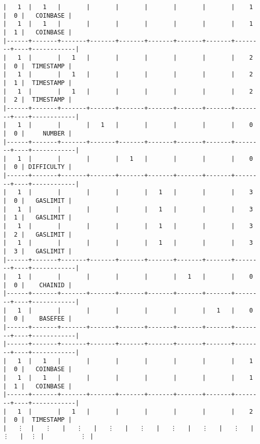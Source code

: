 \documentclass[varwidth=\maxdimen,margin=0.5cm,multi={verbatim}]{standalone}
\begin{document}
\begin{verbatim}
|   1  |   1   |       |       |       |       |       |       |    1   |  0 |   COINBASE |
|   1  |   1   |       |       |       |       |       |       |    1   |  1 |   COINBASE |
|------+-------+-------+-------+-------+-------+-------+-------+--------+----+------------|
|   1  |       |   1   |       |       |       |       |       |    2   |  0 |  TIMESTAMP |
|   1  |       |   1   |       |       |       |       |       |    2   |  1 |  TIMESTAMP |
|   1  |       |   1   |       |       |       |       |       |    2   |  2 |  TIMESTAMP |
|------+-------+-------+-------+-------+-------+-------+-------+--------+----+------------|
|   1  |       |       |   1   |       |       |       |       |    0   |  0 |     NUMBER |
|------+-------+-------+-------+-------+-------+-------+-------+--------+----+------------|
|   1  |       |       |       |   1   |       |       |       |    0   |  0 | DIFFICULTY |
|------+-------+-------+-------+-------+-------+-------+-------+--------+----+------------|
|   1  |       |       |       |       |   1   |       |       |    3   |  0 |   GASLIMIT |
|   1  |       |       |       |       |   1   |       |       |    3   |  1 |   GASLIMIT |
|   1  |       |       |       |       |   1   |       |       |    3   |  2 |   GASLIMIT |
|   1  |       |       |       |       |   1   |       |       |    3   |  3 |   GASLIMIT |
|------+-------+-------+-------+-------+-------+-------+-------+--------+----+------------|
|   1  |       |       |       |       |       |   1   |       |    0   |  0 |    CHAINID |
|------+-------+-------+-------+-------+-------+-------+-------+--------+----+------------|
|   1  |       |       |       |       |       |       |   1   |    0   |  0 |    BASEFEE |
|------+-------+-------+-------+-------+-------+-------+-------+--------+----+------------|
|------+-------+-------+-------+-------+-------+-------+-------+--------+----+------------|
|   1  |   1   |       |       |       |       |       |       |    1   |  0 |   COINBASE |
|   1  |   1   |       |       |       |       |       |       |    1   |  1 |   COINBASE |
|------+-------+-------+-------+-------+-------+-------+-------+--------+----+------------|
|   1  |       |   1   |       |       |       |       |       |    2   |  0 |  TIMESTAMP |
|   ⋮  |   ⋮   |   ⋮   |   ⋮   |   ⋮   |   ⋮   |   ⋮   |   ⋮   |    ⋮   |  ⋮ |          ⋮ |

\end{verbatim}
\end{document}
